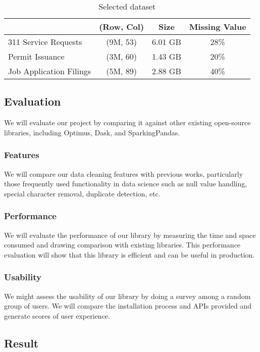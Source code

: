 \documentclass[sigconf]{acmart}
\begin{document}
\begin{table}
\caption{Selected dataset}   
\label{tab:dataset}
\begin{tabular}{lccc}   
 		                 & (Row, Col)  & Size      & Missing Value  \\  
\hline
 311 Service Requests   & (9M, 53)     & 6.01 GB  & 28\%            \\ 
 Permit Issuance            & (3M, 60)     & 1.43 GB  & 20\%             \\  
 Job Application Filings   & (5M, 89)     & 2.88 GB  & 40\%             \\ 


\end{tabular}   
\end{table}

\subsection{Evaluation}
We will evaluate our project by comparing it against other existing open-source libraries, including Optimus\cite{optimus}, Dask\cite{dask}, and SparkingPandas\cite{sparklingpandas}. 
\subsubsection{Features}
We will compare our data cleaning features with previous works, particularly those frequently used functionality in data science such as null value handling, special character removal, duplicate detection, etc. 
\subsubsection{Performance}
We will evaluate the performance of our library by measuring the time and space consumed and drawing comparison with existing libraries. This performance evaluation will show that this library is efficient and can be useful in production. 
\subsubsection{Usability}
We might assess the usability of our library by doing a survey among a random group of users. We will compare the installation process and APIs provided and generate scores of user experience.

\subsection{Result}
\end{document}
